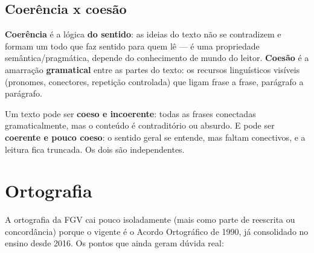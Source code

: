 \subsection{Coerência x coesão}

\begin{conceito}
\textbf{Coerência} é a lógica \textbf{do sentido}: as ideias do texto não se
contradizem e formam um todo que faz sentido para quem lê --- é uma
propriedade semântica/pragmática, depende do conhecimento de mundo do leitor.
\textbf{Coesão} é a amarração \textbf{gramatical} entre as partes do texto:
os recursos linguísticos visíveis (pronomes, conectores, repetição
controlada) que ligam frase a frase, parágrafo a parágrafo.

Um texto pode ser \textbf{coeso e incoerente}: todas as frases conectadas
gramaticalmente, mas o conteúdo é contraditório ou absurdo. E pode ser
\textbf{coerente e pouco coeso}: o sentido geral se entende, mas faltam
conectivos, e a leitura fica truncada. Os dois são independentes.
\end{conceito}

\section{Ortografia}

A ortografia da FGV cai pouco isoladamente (mais como parte de reescrita ou
concordância) porque o vigente é o Acordo Ortográfico de 1990, já
consolidado no ensino desde 2016. Os pontos que ainda geram dúvida real:

